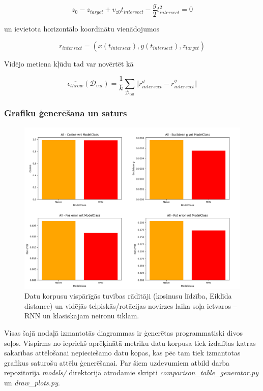 \documentclass[12pt, a4paper]{article}
\numberwithin{equation}{section} %
\begin{document}
\begin{equation}
    z_0 - z_{target} + v_{z0}t_{intersect} - \frac{g}{2}t_{intersect}^2 = 0
\end{equation}

un ievietota horizontālo koordinātu vienādojumos

\begin{equation}
    r_{intersect} = \left ( x(t_{intersect}), y(t_{intersect}), z_{target} \right )
\end{equation}

Vidējo metiena kļūdu tad var novērtēt kā

\begin{equation}
    \overline{\epsilon_{throw}}(\mathcal{D}_{val}) = \frac{1}{k} \sum_{\mathcal{D}_{val}}
    \Vert r^d_{intersect} - r^g_{intersect} \Vert 
\end{equation}


\subsubsection{Grafiku ģenerēšana un saturs}

\begin{figure}[t!]
    \centering
    \includegraphics[width=16cm,page=1]{../img/rnn-naive-global-stepwise.png}
    \caption{Datu korpusu vispārīgās tuvības rādītāji (kosinusu līdzība, Eiklīda distance) un vidējās telpiskās/rotācijas novirzes laika soļa ietvaros -- RNN un klasiskajam neironu tīklam.}
\end{figure}

Visas šajā nodaļā izmantotās diagrammas ir ģenerētas programmatiski divos soļos. Vispirms no iepriekš aprēķinātā metriku datu korpusa tiek izdalītas katras sakarības attēlošanai nepieciešamo datu kopas, kas pēc tam tiek izmantotas grafikus saturošu attēlu ģenerēšanai. Par šiem uzdevumiem atbild darba repozitorija \cite{md_repo} \textit{models/} direktorijā atrodamie skripti \textit{comparison\_table\_generator.py} un \textit{draw\_plots.py}.
\end{document}
